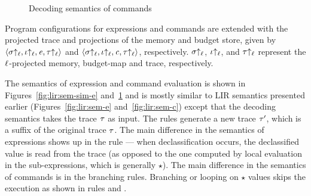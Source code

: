 \begin{figure}[!tb]
\begin{framed}
\end{framed}
\caption{Decoding semantics of commands}
\label{fig:lir:sem-sim-c}
\end{figure}

Program configurations for expressions and commands are extended with
the projected trace and projections of the memory and budget store,
given by $\langle \sigma{\uparrow_\ell}, \iota{\uparrow_\ell}, \mathit{e}, \tau{\uparrow_\ell} \rangle$
and $\langle \sigma{\uparrow_\ell}, \iota{\uparrow_\ell}, \mathit{c}, \tau{\uparrow_\ell} \rangle$,
respectively. $\sigma{\uparrow_\ell}$, $\iota{\uparrow_\ell}$, and $\tau{\uparrow_\ell}$
represent the $\ell$-projected memory, budget-map and trace,
respectively.  

The semantics of expression and command evaluation is shown in
Figures~\ref{fig:lir:sem-sim-e} and~\ref{fig:lir:sem-sim-c} and is
mostly similar to LIR semantics presented earlier
(Figures~\ref{fig:lir:sem-e} and~\ref{fig:lir:sem-c}) except that the
decoding semantics takes the trace  $\tau$ as input. The rules
generate a new trace $\tau'$, which is a suffix of the original
trace $\tau$. The  main difference in the semantics of expressions
shows up in the  rule --- when declassification
occurs, the  declassified value is read from the trace (as opposed to
the one computed by local evaluation in the sub-expressions, which is
generally $\star$). The main difference in the semantics of commands
is in the branching rules. Branching or looping on $\star$ values
skips the execution as shown in rules  and
.  

